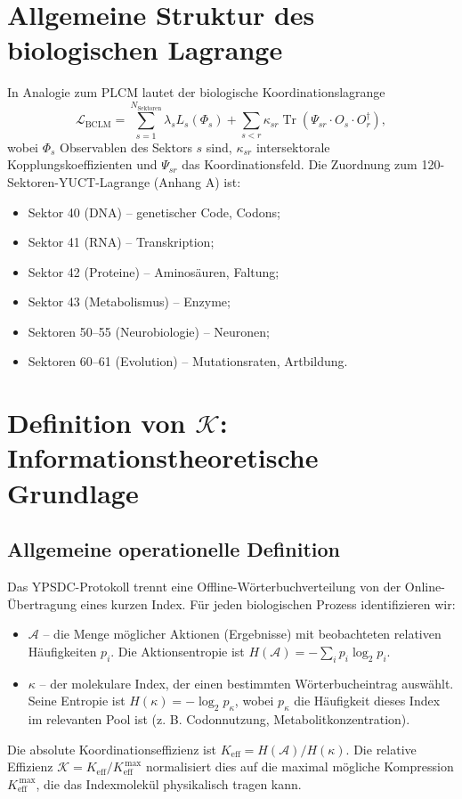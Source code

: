 \documentclass[12pt,a4paper]{article}
\newcommand{\REL}{\mathcal{K}}          %
\newcommand{\ABS}{K_{\mathrm{eff}}}     %
\begin{document}
	\section{Allgemeine Struktur des biologischen Lagrange}
	In Analogie zum PLCM lautet der biologische Koordinationslagrange
	\begin{equation}
		\mathcal{L}_{\text{BCLM}} = \sum_{s=1}^{N_{\text{Sektoren}}} \lambda_s L_s(\Phi_s) + \sum_{s<r} \kappa_{sr} \operatorname{Tr}(\Psi_{sr} \cdot O_s \cdot O_r^\dagger),
		\label{eq:BCLM}
	\end{equation}
	wobei \(\Phi_s\) Observablen des Sektors \(s\) sind, \(\kappa_{sr}\) intersektorale Kopplungskoeffizienten und \(\Psi_{sr}\) das Koordinationsfeld. Die Zuordnung zum 120-Sektoren-YUCT-Lagrange (Anhang A) ist:
	\begin{itemize}
		\item Sektor 40 (DNA) – genetischer Code, Codons;
		\item Sektor 41 (RNA) – Transkription;
		\item Sektor 42 (Proteine) – Aminosäuren, Faltung;
		\item Sektor 43 (Metabolismus) – Enzyme;
		\item Sektoren 50–55 (Neurobiologie) – Neuronen;
		\item Sektoren 60–61 (Evolution) – Mutationsraten, Artbildung.
	\end{itemize}
	
	\section{Definition von \(\REL\): Informationstheoretische Grundlage}
	\label{sec:REL-def}
	
	\subsection{Allgemeine operationelle Definition}
	Das YPSDC-Protokoll trennt eine Offline-Wörterbuchverteilung von der Online-Übertragung eines kurzen Index. Für jeden biologischen Prozess identifizieren wir:
	\begin{itemize}
		\item \(\mathcal{A}\) – die Menge möglicher Aktionen (Ergebnisse) mit beobachteten relativen Häufigkeiten \(p_i\). Die Aktionsentropie ist \(H(\mathcal{A}) = -\sum_i p_i \log_2 p_i\).
		\item \(\kappa\) – der molekulare Index, der einen bestimmten Wörterbucheintrag auswählt. Seine Entropie ist \(H(\kappa) = -\log_2 p_\kappa\), wobei \(p_\kappa\) die Häufigkeit dieses Index im relevanten Pool ist (z. B. Codonnutzung, Metabolitkonzentration).
	\end{itemize}
	Die absolute Koordinationseffizienz ist \(\ABS = H(\mathcal{A})/H(\kappa)\). Die relative Effizienz \(\REL = \ABS / \ABS^{\,\max}\) normalisiert dies auf die maximal mögliche Kompression \(\ABS^{\,\max}\), die das Indexmolekül physikalisch tragen kann.
	
\end{document}

